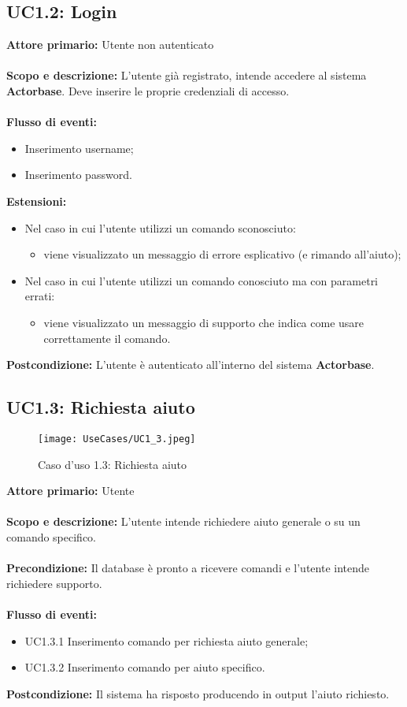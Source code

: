 \documentclass{scalatekids-article}
\begin{document}
\subsection{UC1.2: Login}
\textbf{Attore primario:} Utente non autenticato\\ \\
\textbf{Scopo e descrizione:} L’utente già registrato, intende accedere al sistema \textbf{Actorbase}. Deve inserire le proprie credenziali di accesso. \\ \\
\textbf{Flusso di eventi:}
\begin{itemize}
\item Inserimento username;
\item Inserimento password.
\end{itemize}
\textbf{Estensioni:}
\begin{itemize}
\item Nel caso in cui l'utente utilizzi un comando sconosciuto:
  \begin{itemize}
  \item viene visualizzato un messaggio di errore esplicativo (e rimando all'aiuto);
  \end{itemize}
\item Nel caso in cui l'utente utilizzi un comando conosciuto ma con parametri errati:
  \begin{itemize}
  \item viene visualizzato un messaggio di supporto che indica come usare correttamente il comando.
  \end{itemize}
\end{itemize}
\textbf{Postcondizione:} L'utente è autenticato all'interno del sistema \textbf{Actorbase}.
\subsection{UC1.3: Richiesta aiuto}
\begin{figure}[H]
  \begin{center}
    \texttt{[image: UseCases/UC1\_3.jpeg]}
    \caption{Caso d'uso 1.3: Richiesta aiuto}
  \end{center}
\end{figure}
\textbf{Attore primario:} Utente\\ \\
\textbf{Scopo e descrizione:} L'utente intende richiedere aiuto generale o su un comando specifico.\\ \\
\textbf{Precondizione:} Il database è pronto a ricevere comandi e l'utente intende richiedere supporto.\\ \\
\textbf{Flusso di eventi:}
\begin{itemize}
\item UC1.3.1 Inserimento comando per richiesta aiuto generale;
\item UC1.3.2 Inserimento comando per aiuto specifico.
\end{itemize}
\textbf{Postcondizione:} Il sistema ha risposto producendo in output l'aiuto richiesto.
\end{document}
